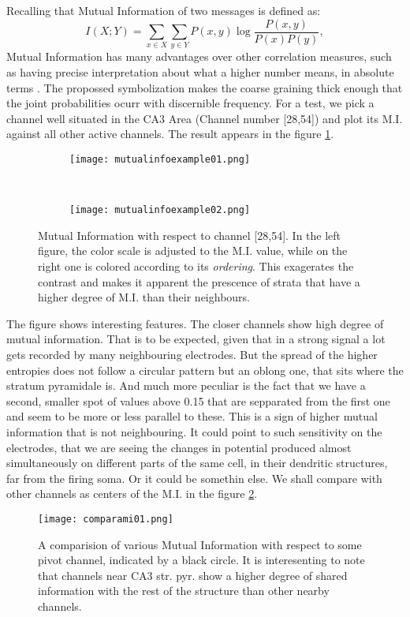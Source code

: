 \documentclass[10pt]{article}
\begin{document}
Recalling that Mutual Information of two messages is defined as:
\begin{equation}
  I(X;Y)=\sum_{x \in X} \sum_{y \in Y} P(x,y) \log \frac{P(x,y)}{P(x)P(y)},
\end{equation}
Mutual Information has many advantages over other correlation measures, such
as having precise interpretation about what a higher number means,
in absolute terms \cite{Brenner2000}. The propossed symbolization makes the
coarse graining thick enough that the joint probabilities ocurr with discernible
frequency. For a test, we pick a channel well situated in the CA3 Area (Channel
number [28,54]) and
plot its M.I. against all other active channels. The result appears
in the figure \ref{exMI1}.
\begin{figure}[h]
  \centering
  \begin{subfigure}[b]{0.45\textwidth}
  \texttt{[image: mutualinfoexample01.png]}  
  \end{subfigure}
  ~
   \begin{subfigure}[b]{0.45\textwidth}
  \texttt{[image: mutualinfoexample02.png]}  
  \end{subfigure}
   \caption{Mutual Information with respect to channel [28,54]. In the
     left figure, the color scale is adjusted to the M.I. value, while on
     the right one is colored according to its \emph{ordering}. This exagerates
     the contrast and makes it apparent the prescence of strata that have a
   higher degree of M.I. than their neighbours. }
  \label{exMI1}
\end{figure}
The figure shows interesting features. The closer channels show high degree
of mutual information. That is to be expected, given that in a strong
signal a lot gets recorded by many neighbouring electrodes. But the spread
of the higher entropies does not follow a circular pattern but an oblong one,
that sits where the stratum pyramidale is. And much more peculiar is the
fact that we have a second, smaller spot of values above 0.15 that are
sepparated from the first one and seem to be more or less parallel to these.
This is a sign of higher mutual information that is not neighbouring. It could
point to such sensitivity on the electrodes, that we are seeing the
changes in potential produced almost simultaneously on different parts
of the same cell, in their dendritic structures, far from the firing soma.
Or it could be somethin else. We shall compare with other channels as
centers of the M.I. in the figure \ref{variasMI}.
\begin{figure}[h]
  \centering
  \texttt{[image: comparami01.png]}
  \caption{A comparision of various Mutual Information with
    respect to some pivot channel, indicated by a black circle. It is
    interesenting to note that channels near CA3 str. pyr. show a higher degree
    of shared information with the rest of the structure
    than other nearby channels.}
   \label{variasMI}
\end{figure}
\end{document}
